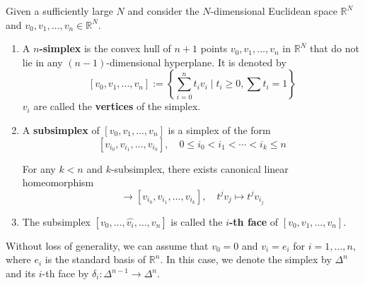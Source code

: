 \documentclass[12pt, oneside]{book}
\begin{document}
\begin{definition}
    Given a sufficiently large $N$ and consider the $N$-dimensional Euclidean space $\mathbb{R}^N$ and $v_0,v_1,\ldots,v_n \in \mathbb{R}^N$.

    \begin{enumerate}
        \item
              A \textbf{$n$-simplex} is the convex hull of $n+1$ points $v_0,v_1,\ldots,v_n$ in $\mathbb{R}^N$ that do not lie in any $(n-1)$-dimensional hyperplane. It is denoted by
              \begin{equation*}
                  \left[v_0,v_1,\ldots,v_n\right]
                  :=
                  \left\{\sum_{i=0}^{n}t_iv_i \mid t_i \geq 0, \sum  t_i=1\right\}
              \end{equation*}
              $v_i$ are called the \textbf{vertices} of the simplex.
        \item
              A \textbf{subsimplex} of $\left[v_0,v_1,\ldots,v_n\right]$ is a simplex of the form
              \begin{equation*}
                  \left[v_{i_0},v_{i_1},\ldots,v_{i_k}\right],\quad 0\leq i_0< i_1<\cdots<i_k\leq n
              \end{equation*}


              For any $k<n$ and $k$-subsimplex, there exists canonical linear homeomorphism
              \begin{equation*}
                  [v_0,v_1,\ldots,v_k]
                  \to
                  \left[v_{i_0},v_{i_1},\ldots,v_{i_k}\right],\quad
                  t^jv_j \mapsto t^jv_{i_j}
              \end{equation*}
        \item
              The subsimplex $\left[v_0,\ldots,\hat{v_i},\ldots,v_n\right]$ is called the \textbf{$i$-th face} of $\left[v_0,v_1,\ldots,v_n\right]$.
    \end{enumerate}
    \begin{remark}
        Without loss of generality, we can assume that $v_0=0$ and $v_i=e_i$ for $i=1,\ldots,n$, where $e_i$ is the standard basis of $\mathbb{R}^n$.
        In this case, we denote the simplex by $\Delta^n$ and its $i$-th face by $\delta_i: \Delta^{n-1}\to \Delta^n$.
    \end{remark}





\end{definition}
\end{document}
